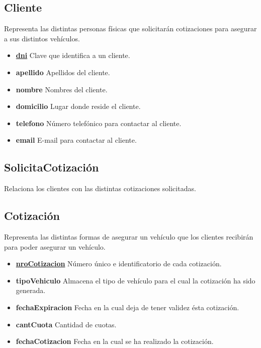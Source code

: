 \documentclass[a4paper,11pt]{article}
\begin{document}
\subsection{Cliente}

Representa las distintas personas físicas que solicitarán cotizaciones para asegurar 
a sus distintos vehículos.

\begin{itemize}

  \item \textbf{\uline{dni}} Clave que identifica a un cliente.
  
  \item \textbf{apellido} Apellidos del cliente.

  \item \textbf{nombre} Nombres del cliente.
  
  \item \textbf{domicilio} Lugar donde reside el cliente.
  
  \item \textbf{telefono} Número telefónico para contactar al cliente.
  
  \item \textbf{email} E-mail para contactar al cliente.
  
\end{itemize}

\subsection{SolicitaCotización}

Relaciona los clientes con las distintas cotizaciones solicitadas.

\subsection{Cotización}

Representa las distintas formas de asegurar un vehículo que los clientes recibirán para poder asegurar
un vehículo.

\begin{itemize}

  \item \textbf{\uline{nroCotizacion}} Número único e identificatorio de cada cotización.
  
  \item \textbf{tipoVehiculo} Almacena el tipo de vehículo para el cual la cotización ha sido generada.

  \item \textbf{fechaExpiracion} Fecha en la cual deja de tener validez ésta cotización.
  
  \item \textbf{cantCuota} Cantidad de cuotas.

  \item \textbf{fechaCotizacion} Fecha en la cual se ha realizado la cotización.
      
\end{itemize}
\end{document}

